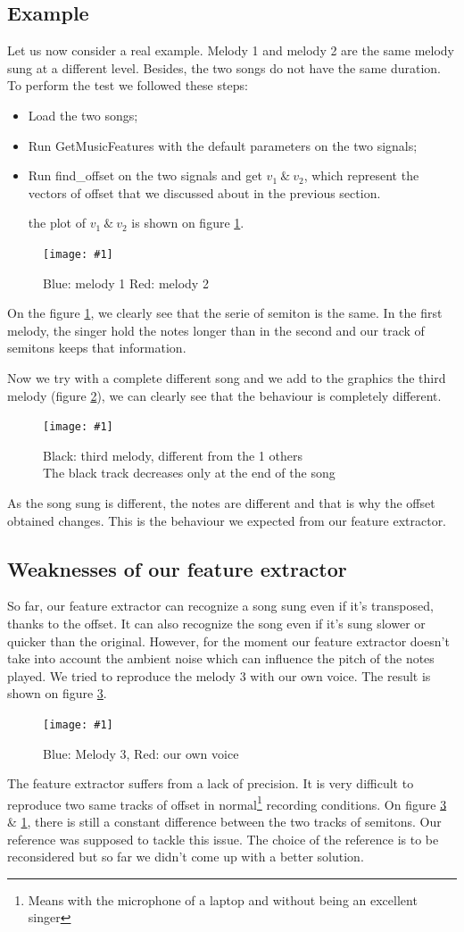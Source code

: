 \documentclass[a4paper]{report}
\newcommand{\img}[3]{\begin{figure}[!h] \centering \texttt{[image: \#1]}\captionsetup{justification=centering} \caption{#3} \label{#1} \end{figure}}
\begin{document}
\subsection{Example}
Let us now consider a real example. Melody 1 and melody 2 are the same melody sung at a different level. Besides, the two songs do not have the same duration.
To perform the test we followed these steps: \begin{itemize}
\item Load the two songs;
\item Run GetMusicFeatures with the default parameters on the two signals;
\item Run find\_offset on the two signals and get $v_{1}~\&~v_{2}$, which represent the vectors of offset that we discussed about in the previous section.

the plot of $v_{1}~\&~v_{2}$ is shown on figure \ref{test_extractor}.
\end{itemize}
\img{test_extractor}{.45}{ {\color{blue}Blue: melody 1} {\color{red}Red: melody 2}}
On the figure \ref{test_extractor}, we clearly see that the serie of semiton is the same. In the first melody, the singer hold the notes longer than in the second and our track of semitons keeps that information.


Now we try with a complete different song and we add to the graphics the third melody (figure \ref{Comparison_3_songs}), we can clearly see that the behaviour is completely different. 
\img{Comparison_3_songs}{0.5}{Black: third melody, different from the  1 others\\The black track decreases only at the end of the song}

As the song sung is different, the notes are different and that is why the offset obtained changes. This is the behaviour we expected from our feature extractor.

\pagebreak
\subsection{Weaknesses of our feature extractor}

So far, our feature extractor can recognize a song sung even if it's transposed, thanks to the offset. It can also recognize the song even if it's sung slower or quicker than the original. However, for the moment our feature extractor doesn't take into account the ambient noise which can influence the pitch of the notes played.
We tried to reproduce the melody 3 with our own voice. The result is shown on figure \ref{melody3_experience}.

\img{melody3_experience}{.3}{{\color{blue}Blue: Melody 3}, {\color{red}Red: our own voice}}
The feature extractor suffers from a lack of precision. It is very difficult to reproduce two same tracks of offset in normal\footnote{Means with the microphone of a laptop and without being an excellent singer} recording conditions. On figure \ref{melody3_experience} \& \ref{test_extractor}, there is still a constant difference between the two tracks of semitons. Our reference was supposed to tackle this issue. The choice of the reference is to be reconsidered but so far we didn't come up with a better solution.
\end{document}
